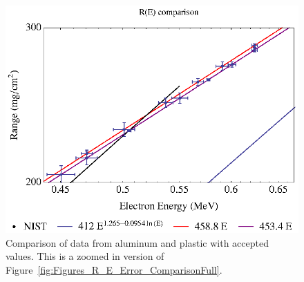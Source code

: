\begin{figure}[tbp]
	\centering
		\includegraphics[width=.8\textwidth]{Figures/R_E_Error_ComparisonFullZoomIn.eps}
	\caption{Comparison of data from aluminum and plastic with accepted values.  This is a zoomed in version of Figure~\ref{fig:Figures_R_E_Error_ComparisonFull}.}
	\label{fig:Figures_R_E_Error_ComparisonFullZoomIn}
\end{figure}%

